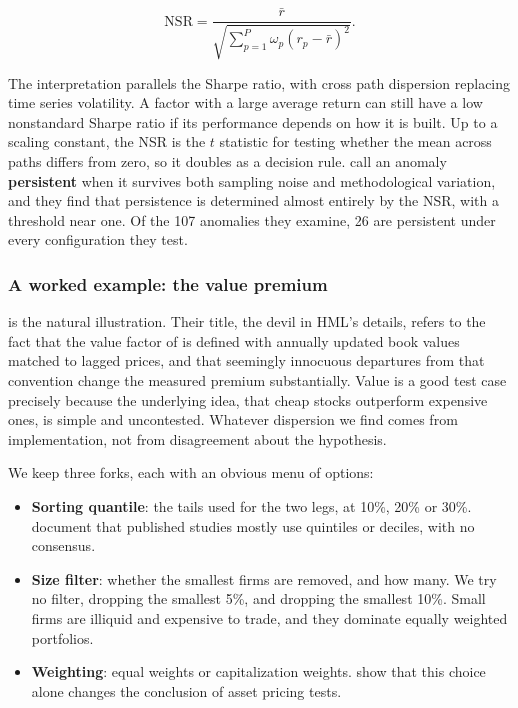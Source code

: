 \begin{equation}
\label{eq_design_nsr_simple}
\text{NSR} = \frac{\bar{r}}{\sqrt{\sum_{p=1}^P \omega_p (r_p - \bar{r})^2}}.
\end{equation}

The interpretation parallels the Sharpe ratio, with cross path dispersion replacing time series volatility. A factor with a large average return can still have a low nonstandard Sharpe ratio if its performance depends on how it is built. Up to a scaling constant, the NSR is the $t$ statistic for testing whether the mean across paths differs from zero, so it doubles as a decision rule. \cite{coqueret2026persistent} call an anomaly \textbf{persistent} when it survives both sampling noise and methodological variation, and they find that persistence is determined almost entirely by the NSR, with a threshold near one. Of the 107 anomalies they examine, 26 are persistent under every configuration they test.

\subsubsection{A worked example: the value premium}\label{sec_design_value}

\cite{asness2013devil} is the natural illustration. Their title, the devil in HML's details, refers to the fact that the value factor of \cite{fama1993common} is defined with annually updated book values matched to lagged prices, and that seemingly innocuous departures from that convention change the measured premium substantially. Value is a good test case precisely because the underlying idea, that cheap stocks outperform expensive ones, is simple and uncontested. Whatever dispersion we find comes from implementation, not from disagreement about the hypothesis.

We keep three forks, each with an obvious menu of options:

\begin{itemize}
\item \textbf{Sorting quantile}: the tails used for the two legs, at 10\%, 20\% or 30\%. \cite{chen2021open} document that published studies mostly use quintiles or deciles, with no consensus.
\item \textbf{Size filter}: whether the smallest firms are removed, and how many. We try no filter, dropping the smallest 5\%, and dropping the smallest 10\%. Small firms are illiquid and expensive to trade, and they dominate equally weighted portfolios.
\item \textbf{Weighting}: equal weights or capitalization weights. \cite{plyakha2021equal} show that this choice alone changes the conclusion of asset pricing tests.
\end{itemize}

